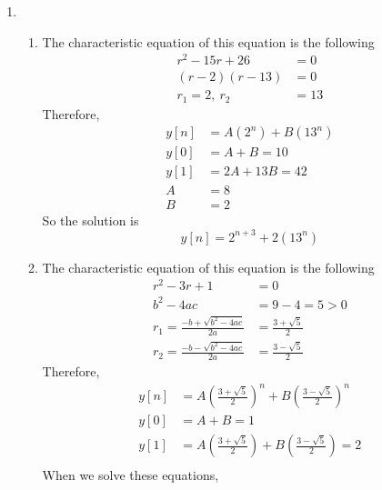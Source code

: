 \documentclass[10pt,a4paper, margin=1in]{article}
\begin{document}
\begin{enumerate}
\item 
    \begin{enumerate}
    \item %
    The characteristic equation of this equation is the following
    \begin{equation}
	\begin{split}
		r^2-15r+26 &= 0 \\
		(r - 2) (r - 13) &= 0 \\
		r_1 = 2, \ 	r_2 & = 13
	\end{split}	
    \end{equation}
    Therefore,
    \begin{equation}
	\begin{split}
		y[n] & = A(2^n) + B(13^n) \\
		y[0] & = A + B = 10 \\
		y[1] & = 2A + 13B = 42 \\
		A & = 8 \\
		B & = 2 
	\end{split}	
    \end{equation}
    So the solution is
    \begin{equation}
	y[n]  = 2^{n+3} + 2(13^n) 
    \end{equation}
    \item %
    The characteristic equation of this equation is the following
    \begin{equation}
	\begin{split}
		r^2-3r+1 &= 0 \\
		b^2 - 4ac & = 9-4 = 5 > 0 \\ 
		r_1 = \frac{-b+\sqrt{b^2-4ac}}{2a} & = \frac{3+\sqrt{5}}{2} \\
		r_2 = \frac{-b-\sqrt{b^2-4ac}}{2a} & = \frac{3-\sqrt{5}}{2} 
	\end{split}	
    \end{equation}
    Therefore,
    \begin{equation}
	\begin{split}
		y[n] & = A\left(\frac{3+\sqrt{5}}{2}\right)^n + B\left(\frac{3-\sqrt{5}}{2}\right)^n \\
		y[0] & = A + B = 1 \\
		y[1] & = A\left(\frac{3+\sqrt{5}}{2}\right) + B\left(\frac{3-\sqrt{5}}{2}\right) = 2 \\ 
		\end{split}	
    \end{equation}
	When we solve these equations,
    \begin{equation}

\end{equation}
\end{enumerate}
\end{enumerate}
\end{document}
